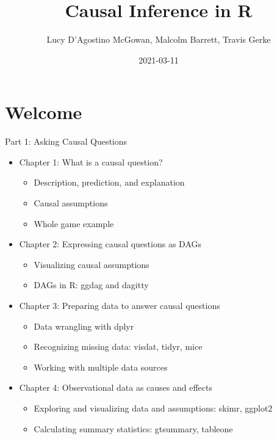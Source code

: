 \documentclass[
]{krantz}
\title{Causal Inference in R}
\author{Lucy D'Agostino McGowan, Malcolm Barrett, Travis Gerke}
\date{2021-03-11}
\providecommand{\tightlist}{%
  \setlength{\itemsep}{0pt}\setlength{\parskip}{0pt}}
\begin{document}
\maketitle

\hypertarget{welcome}{%
\section*{Welcome}\label{welcome}}

Part 1: Asking Causal Questions

\begin{itemize}
\tightlist
\item
  Chapter 1: What is a causal question?

  \begin{itemize}
  \tightlist
  \item
    Description, prediction, and explanation\\
  \item
    Causal assumptions\\
  \item
    Whole game example
  \end{itemize}
\item
  Chapter 2: Expressing causal questions as DAGs

  \begin{itemize}
  \tightlist
  \item
    Visualizing causal assumptions\\
  \item
    DAGs in R: ggdag and dagitty
  \end{itemize}
\item
  Chapter 3: Preparing data to answer causal questions

  \begin{itemize}
  \tightlist
  \item
    Data wrangling with dplyr\\
  \item
    Recognizing missing data: visdat, tidyr, mice\\
  \item
    Working with multiple data sources
  \end{itemize}
\item
  Chapter 4: Observational data as causes and effects

  \begin{itemize}
  \tightlist
  \item
    Exploring and visualizing data and assumptions: skimr, ggplot2\\
  \item
    Calculating summary statistics: gtsummary, tableone
  \end{itemize}
\end{itemize}
\end{document}
